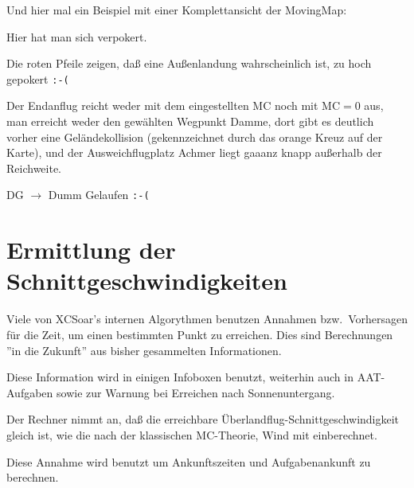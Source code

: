 Und hier mal ein Beispiel mit einer Komplettansicht der MovingMap:

\vspace{2em}
Hier hat man sich  verpokert. 


Die roten Pfeile zeigen, daß eine Außenlandung wahrscheinlich ist,  zu hoch gepokert \texttt{:-(}

Der Endanflug reicht weder mit dem eingestellten MC noch mit MC$=0$ aus, man erreicht weder den gewählten Wegpunkt \textsf{Damme}, dort gibt es deutlich vorher eine Geländekollision (gekennzeichnet durch das orange Kreuz auf der Karte), und der Ausweichflugplatz \textsf{Achmer} liegt gaaanz knapp außerhalb der Reichweite.

DG $\rightarrow$ Dumm Gelaufen \verb":-("

\vspace{2em}
\section{Ermittlung der Schnittgeschwindigkeiten}\label{sec:task-speed-estim}

Viele von \textsf{XCSoar's} internen Algorythmen benutzen Annahmen bzw.\ Vorhersagen für die Zeit, um
einen bestimmten Punkt zu erreichen. Dies sind Berechnungen ''in die Zukunft''  aus bisher 
gesammelten Informationen.

Diese Information wird in einigen Infoboxen benutzt, weiterhin auch in AAT-Aufgaben
sowie zur Warnung bei Erreichen nach Sonnenuntergang.

Der Rechner nimmt an, daß die erreichbare Überlandflug-Schnittgeschwindigkeit
gleich ist, wie die nach der klassischen MC-Theorie, Wind mit einberechnet.

Diese Annahme wird benutzt um Ankunftszeiten und Aufgabenankunft zu berechnen.

